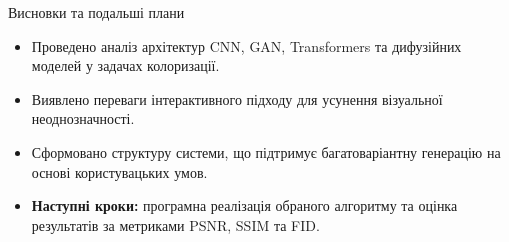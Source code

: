 \documentclass[aspectratio=169]{beamer}
\begin{document}
    \begin{frame}{Висновки та подальші плани}
        \begin{itemize}
            \item Проведено аналіз архітектур CNN, GAN, Transformers та дифузійних моделей у задачах колоризації.
            \item Виявлено переваги інтерактивного підходу для усунення візуальної неоднозначності.
            \item Сформовано структуру системи, що підтримує багатоваріантну генерацію на основі користувацьких умов.
            \item \textbf{Наступні кроки:} програмна реалізація обраного алгоритму та оцінка результатів за метриками PSNR, SSIM та FID.
        \end{itemize}
    \end{frame}
\end{document}
